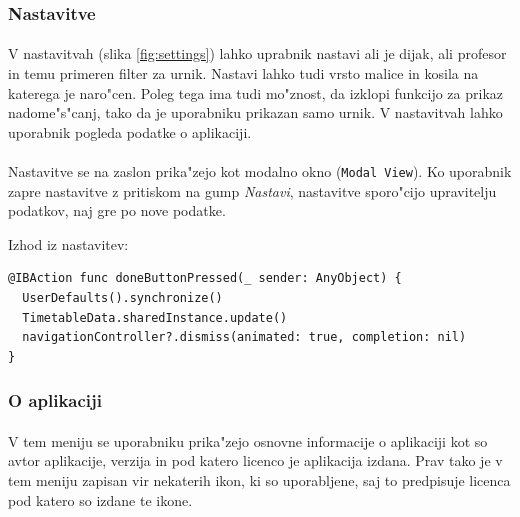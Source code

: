 \subsubsection{Nastavitve}
\paragraph{}V nastavitvah (slika \ref{fig:settings}) lahko uprabnik nastavi ali je dijak, ali profesor in temu primeren filter za urnik. Nastavi lahko tudi vrsto malice in kosila na katerega je naro"cen. Poleg tega ima tudi mo"znost, da izklopi funkcijo za prikaz nadome"s"canj, tako da je uporabniku prikazan samo urnik. V nastavitvah lahko uporabnik pogleda podatke o aplikaciji.

\paragraph{}
Nastavitve se na zaslon prika"zejo kot modalno okno (\texttt{Modal View}). Ko uporabnik zapre nastavitve z pritiskom na gump \textit{Nastavi}, nastavitve sporo"cijo upravitelju podatkov, naj gre po nove podatke.

\begin{center}
	Izhod iz nastavitev:
\end{center}
\begin{verbatim}
@IBAction func doneButtonPressed(_ sender: AnyObject) {
  UserDefaults().synchronize()
  TimetableData.sharedInstance.update()
  navigationController?.dismiss(animated: true, completion: nil)
}
\end{verbatim}


\subsubsection{O aplikaciji}
\paragraph{}V tem meniju se uporabniku prika"zejo osnovne informacije o aplikaciji kot so avtor aplikacije, verzija in pod katero licenco\cite{license-wiki} je aplikacija izdana. Prav tako je v tem meniju zapisan vir nekaterih ikon, ki so uporabljene, saj to predpisuje licenca pod katero so izdane te ikone.
